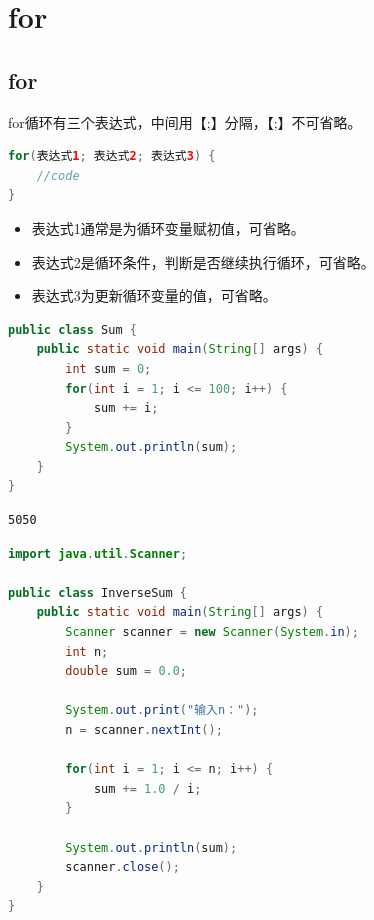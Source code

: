 \section{for}

\subsection{for}

for循环有三个表达式，中间用【;】分隔，【;】不可省略。

\vspace{-0.5cm}

\begin{lstlisting}[language=Java]
for(表达式1; 表达式2; 表达式3) {
    //code
}
\end{lstlisting}

\begin{itemize}
	\item 表达式1通常是为循环变量赋初值，可省略。
	\item 表达式2是循环条件，判断是否继续执行循环，可省略。
	\item 表达式3为更新循环变量的值，可省略。
\end{itemize}

\vspace{0.5cm}


\begin{lstlisting}[language=Java]
public class Sum {
    public static void main(String[] args) {
        int sum = 0;
        for(int i = 1; i <= 100; i++) {
            sum += i;
        }
        System.out.println(sum);
    }
}
\end{lstlisting}

\begin{tcolorbox}
\begin{verbatim}
5050
\end{verbatim}
\end{tcolorbox}

\vspace{0.5cm}


\begin{lstlisting}[language=Java]
import java.util.Scanner;

public class InverseSum {
    public static void main(String[] args) {
        Scanner scanner = new Scanner(System.in);
        int n;
        double sum = 0.0;
        
        System.out.print("输入n：");
        n = scanner.nextInt();
        
        for(int i = 1; i <= n; i++) {
            sum += 1.0 / i;
        }
        
        System.out.println(sum);
        scanner.close();
    }
}
\end{lstlisting}

